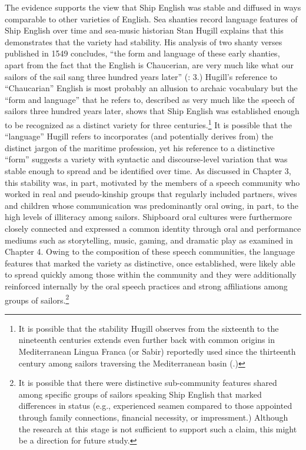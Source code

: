   The evidence supports the view that Ship English was stable and diffused in ways comparable to other varieties of English. Sea shanties record language features of Ship English over time and sea-music historian Stan Hugill explains that this demonstrates that the variety had stability. His analysis of two shanty verses published in 1549 concludes, “the form and language of these early shanties, apart from the fact that the English is Chaucerian, are very much like what our sailors of the sail sang three hundred years later” (\citealt{Hugill1969}: 3.) Hugill’s reference to “Chaucarian” English is most probably an allusion to archaic vocabulary but the “form and language” that he refers to, described as very much like the speech of sailors three hundred years later, shows that Ship English was established enough to be recognized as a distinct variety for three centuries.\footnote{It is possible that the stability Hugill observes from the sixteenth to the nineteenth centuries extends even further back with common origins in Mediterranean Lingua Franca (or Sabir) reportedly used since the thirteenth century among sailors traversing the Mediterranean basin (\citealt{Parkvall2005}.)}  It is possible that the “language” Hugill refers to incorporates (and potentially derives from) the distinct jargon of the maritime profession, yet his reference to a distinctive “form” suggests a variety with syntactic and discourse-level variation that was stable enough to spread and be identified over time. As discussed in Chapter 3, this stability was, in part, motivated by the members of a speech community who worked in real and pseudo-kinship groups that regularly included partners, wives and children whose communication was predominantly oral owing, in part, to the high levels of illiteracy among sailors. Shipboard oral cultures were furthermore closely connected and expressed a common identity through oral and performance mediums such as storytelling, music, gaming, and dramatic play as examined in Chapter 4. Owing to the composition of these speech communities, the language features that marked the variety as distinctive, once established, were likely able to spread quickly among those within the community and they were additionally reinforced internally by the oral speech practices and strong affiliations among groups of sailors.\footnote{It is possible that there were distinctive sub-community features shared among specific groups of sailors speaking Ship English that marked differences in status (e.g., experienced seamen compared to those appointed through family connections, financial necessity, or impressment.) Although the research at this stage is not sufficient to support such a claim, this might be a direction for future study.}  

